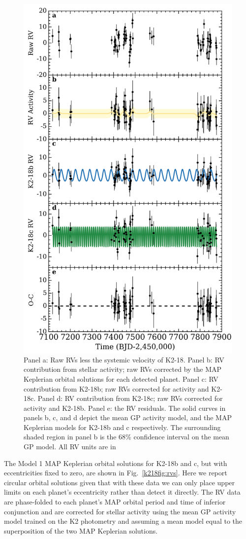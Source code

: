 \begin{figure}
  \centering
  \includegraphics[width=0.8\hsize]{figures/fullRVs.png}%
  \caption[Various HARPS RV components modelled for K2-18.]
    {\small Panel a: Raw RVs less the systemic velocity of
    K2-18. Panel b: RV contribution from stellar activity; raw RVs
    corrected by the MAP Keplerian orbital solutions for each detected planet.
    Panel c: RV contribution from K2-18b; raw RVs corrected for
    activity and K2-18c.
    Panel d: RV contribution from K2-18c; raw RVs corrected for
    activity and K2-18b. Panel e: the RV residuals.
    The solid curves in panels b, c, and d depict the mean GP activity model,
    and the MAP Keplerian models for K2-18b and c respectively.
    The surrounding shaded region in panel b is the 68\% confidence interval on the mean
    GP model. All RV units are in }
  \label{k218fig:fullrvs}
\end{figure}


The Model 1 MAP Keplerian orbital solutions for K2-18b and c, but with eccentricities fixed to zero,
are shown in Fig.~\ref{k218fig:rvs}. Here we report circular orbital solutions given that with these data we can
only place upper limits on each planet's eccentricity rather than detect it directly.
The RV data are phase-folded to each planet's MAP orbital period and
time of inferior conjunction and are corrected for stellar activity using the mean GP activity model trained
on the K2 photometry and assuming a mean model equal to the superposition of the two MAP Keplerian solutions. 

